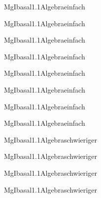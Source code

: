 \documentclass[12pt]{article}
\begin{document}
\begin{Add}{MgI}{basal1.1}{Algebra}{einfach}
\solution{ }
\end{Add}
\begin{Add}{MgI}{basal1.1}{Algebra}{einfach}
\end{Add}

\begin{Add}{MgI}{basal1.1}{Algebra}{einfach}
\solution{ }
\end{Add}
\begin{Add}{MgI}{basal1.1}{Algebra}{einfach}
\end{Add}

\begin{Add}{MgI}{basal1.1}{Algebra}{einfach}
\solution{ }
\end{Add}
\begin{Add}{MgI}{basal1.1}{Algebra}{einfach}
\end{Add}

\begin{Add}{MgI}{basal1.1}{Algebra}{einfach}
\solution{ }
\end{Add}
\begin{Add}{MgI}{basal1.1}{Algebra}{einfach}
\end{Add}

\begin{Add}{MgI}{basal1.1}{Algebra}{schwieriger}
\solution{ }
\end{Add}
\begin{Add}{MgI}{basal1.1}{Algebra}{schwieriger}
\end{Add}

\begin{Add}{MgI}{basal1.1}{Algebra}{schwieriger}
\solution{ }
\end{Add}
\begin{Add}{MgI}{basal1.1}{Algebra}{schwieriger}
\end{Add}
\end{document}
